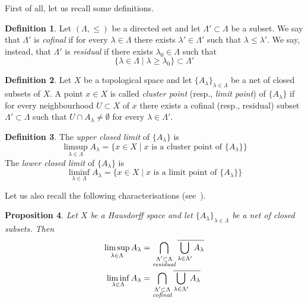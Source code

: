 \documentclass[reqno,oneside]{amsart}
\theoremstyle{definition}
\newtheorem{definition}{Definition}[section]
\theoremstyle{plain}
\newtheorem{proposition}[definition]{Proposition}
\theoremstyle{remark}
\begin{document}
First of all, let us recall some definitions.
\begin{definition}
	Let $(\Lambda,\leq)$ be a directed set and let $\Lambda'\subset\Lambda$ be a subset. We say that $\Lambda'$ is \emph{cofinal} if for every $\lambda\in\Lambda$ there exists $\lambda'\in\Lambda'$ such that $\lambda\leq\lambda'$. We say, instead, that $\Lambda'$ is \emph{residual} if there exists $\lambda_0\in\Lambda$ such that
	\[
		\{\lambda\in\Lambda \mid \lambda\geq\lambda_0\}\subset\Lambda'
	\]
\end{definition}
\begin{definition}
	Let $X$ be a topological space and let $\{A_\lambda\}_{\lambda\in\Lambda}$ be a net of closed subsets of $X$. A point $x\in X$ is called \emph{cluster point} (resp., \emph{limit point}) of $\{A_\lambda\}$ if for every neighbourhood $U\subset X$ of $x$ there exists a cofinal (resp., residual) subset $\Lambda'\subset\Lambda$ such that $U\cap A_\lambda\neq\emptyset$ for every $\lambda\in\Lambda'$.
\end{definition}
\begin{definition}
	The \emph{upper closed limit} of $\{A_\lambda\}$ is
	\[
		\limsup_{\lambda\in\Lambda} A_\lambda=\bigl\{x\in X \mid \text{$x$ is a cluster point of $\{A_\lambda\}$}\bigr\}
	\]
	The \emph{lower closed limit} of $\{A_\lambda\}$ is
	\[
		\liminf_{\lambda\in\Lambda} A_\lambda=\bigl\{x\in X \mid \text{$x$ is a limit point of $\{A_\lambda\}$}\bigr\}
	\]
\end{definition}

Let us also recall the following characterisations (see~\cite[Proposition~5.2.2]{beer:closedsets}).
\begin{proposition}
	Let $X$ be a Hausdorff space and let $\{A_\lambda\}_{\lambda\in\Lambda}$ be a net of closed subsets. Then
	\begin{align*}
		\limsup_{\lambda\in\Lambda} A_\lambda &= \bigcap_{\substack{\Lambda'\subset\Lambda \\ \text{\emph{residual}}}}\overline{\bigcup_{\lambda\in\Lambda'} A_\lambda} \\
		\liminf_{\lambda\in\Lambda} A_\lambda &= \bigcap_{\substack{\Lambda'\subset\Lambda \\ \text{\emph{cofinal}}}}\overline{\bigcup_{\lambda\in\Lambda'} A_\lambda}
	\end{align*}
\end{proposition}
\end{document}
